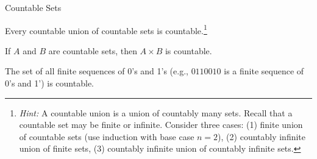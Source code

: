 \begin{section}{Countable Sets}
\begin{theorem}
Every countable union of countable sets is countable.\footnote{\emph{Hint:} A countable union is a union of countably many sets.  Recall that a countable set may be finite or infinite.  Consider three cases: (1) finite union of countable sets (use induction with base case $n=2$), (2) countably infinite union of finite sets, (3) countably infinite union of countably infinite sets.}
\end{theorem}

\begin{theorem}
If $A$ and $B$ are countable sets, then $A\times B$ is countable.
\end{theorem}

\begin{theorem}
The set of all finite sequences of 0's and 1's (e.g., $0110010$ is a finite sequence of 0's and 1') is countable. 
\end{theorem}



\end{section}